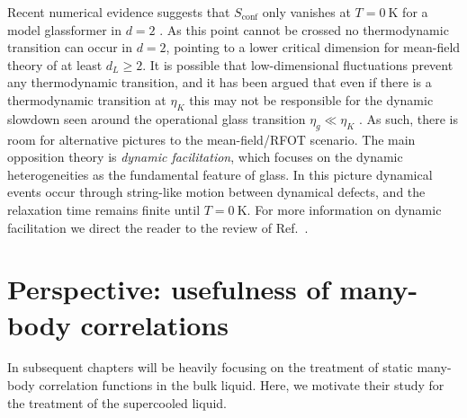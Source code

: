 \documentclass[11pt,twoside]{report}
\begin{document}
Recent numerical evidence suggests that $S_\mathrm{conf}$ only vanishes at $T=\SI{0}{\kelvin}$ for a model glassformer in $d=2$ \cite{BerthierNC2019}.
As this point cannot be crossed no thermodynamic transition can occur in $d = 2$, pointing to a lower critical dimension for mean-field theory of at least $d_L \ge 2$.
It is possible that low-dimensional fluctuations prevent any thermodynamic transition, and it has been argued that even if there is a thermodynamic transition at $\eta_K$ this may not be responsible for the dynamic slowdown seen around the operational glass transition $\eta_g \ll \eta_K$ \cite{WyartPRL2017}.
As such, there is room for alternative pictures to the mean-field/RFOT scenario.
The main opposition theory is \emph{dynamic facilitation}, which focuses on the dynamic heterogeneities as the fundamental feature of glass.
In this picture dynamical events occur through string-like motion between dynamical defects, and the relaxation time remains finite until $T = \SI{0}{\kelvin}$.
For more information on dynamic facilitation we direct the reader to the review of Ref.\ \cite{ChandlerARPC2010}.


\section{Perspective: usefulness of many-body correlations}
\label{sec:correlation-perspective}

In subsequent chapters will be heavily focusing on the treatment of static many-body correlation functions in the bulk liquid.
Here, we motivate their study for the treatment of the supercooled liquid.
\end{document}
